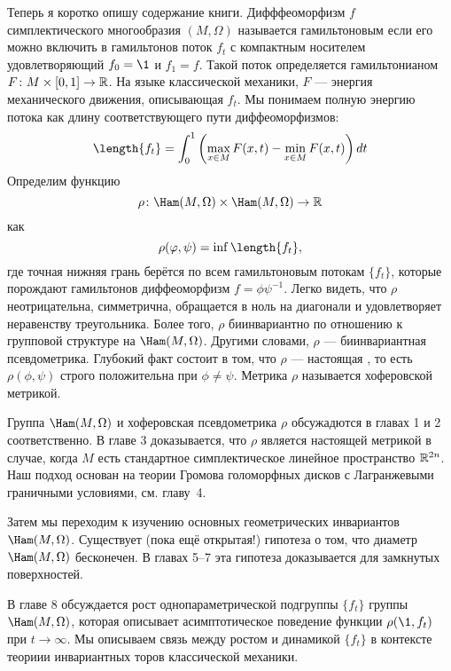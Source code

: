 Теперь я коротко опишу содержание книги.
Дифффеоморфизм $f$ симплектического многообразия $(M,\Omega)$
называется гамильтоновым если его можно включить в гамильтонов поток
$f_t$ с компактным носителем удовлетворяющий $f_0=\1$ и $f_1 =f$.
Такой поток определяется гамильтонианом $F\colon M \times [0, 1] \to \mathbb{R}$.
На языке классической механики, $F$ --- энергия механического движения, описывающая $f_t$.
Мы понимаем полную энергию потока как длину соответствующего пути диффеоморфизмов:
\[\length \{f_t\} =
\int_0^1\left(\max_{x\in M}F(x,t)-\min_{x\in M}F(x,t)\right) dt 
\]%
Определим функцию
\[\rho\: \Ham(M,\Omega) \times \Ham(M,\Omega) \to \RR\]
как
\[\rho (\phi, \psi) = \inf \length \{f_t\},\]
где точная нижняя грань берётся по всем гамильтоновым потокам $\{f_t\}$, которые
порождают гамильтонов диффеоморфизм $f = \phi\psi^{-1}$.
Легко видеть, что $\rho$ неотрицательна, симметрична, обращается в ноль на диагонали и удовлетворяет неравенству треугольника.
Более того, $\rho$ биинвариантно по отношению к групповой структуре на $\Ham(M,\Omega)$.
Другими словами, $\rho$ --- биинвариантная псевдометрика.
Глубокий факт состоит в том, что $\rho$ --- настоящая , то есть $\rho (\phi, \psi)$ строго положительна при $\phi \ne \psi$.
Метрика $\rho$ называется хоферовской метрикой.

Группа $\Ham(M,\Omega)$ и хоферовская псевдометрика $\rho$ обсужадются в главах 1 и 2 соответственно.
В главе 3 доказывается, что $\rho$ является настоящей метрикой в случае, когда $M$ есть стандартное симплектическое линейное пространство $\mathbb{R}^{2n}$.
Наш подход основан на теории Громова голоморфных дисков с Лагранжевыми граничными условиями, см.
главу~4.

Затем мы переходим к изучению основных геометрических инвариантов $\Ham(M,\Omega)$.
Существует (пока ещё открытая!) гипотеза о том, что диаметр $\Ham(M,\Omega)$ бесконечен.
В главах 5--7 эта гипотеза доказывается для замкнутых поверхностей.

В главе 8 обсуждается рост однопараметрической подгруппы $\{f_t\}$ группы $\Ham(M,\Omega)$, которая описывает асимптотическое поведение функции $\rho (\1, f_t)$ при $t \to \infty$.
Мы описываем связь между ростом и динамикой $\{f_t\}$ в контексте
теориии инвариантных торов классической механики.

